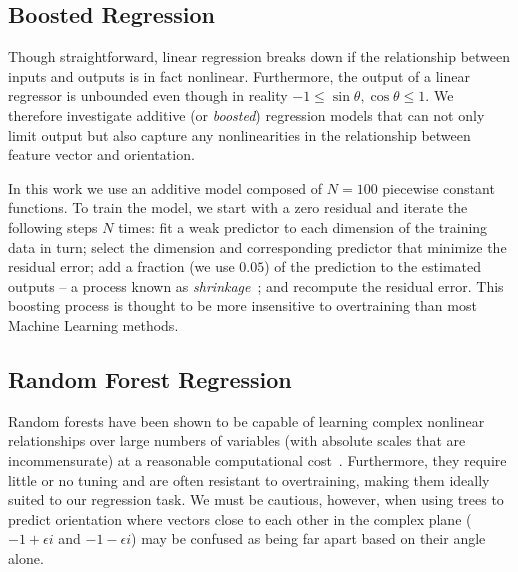 \documentclass[10pt,twocolumn,letterpaper]{article}
\begin{document}
%


\subsection{Boosted Regression}
\label{s:learning_boosted}
Though straightforward, linear regression breaks down if the relationship between inputs and outputs is in fact nonlinear. Furthermore, the output of a linear regressor is unbounded even though in reality $-1 \leq \sin\theta,\cos\theta \leq 1$. We therefore investigate additive (or \emph{boosted}) regression models that can not only limit output but also capture any nonlinearities in the relationship between feature vector and orientation.

In this work we use an additive model composed of $N=100$ piecewise constant functions. To train the model, we start with a zero residual and iterate the following steps $N$ times: fit a weak predictor to each dimension of the training data in turn; select the dimension and corresponding predictor that minimize the residual error; add a fraction (we use $0.05$) of the prediction to the estimated outputs -- a process known as \emph{shrinkage}~\cite{Friedman_AoS01}; and recompute the residual error. This boosting process is thought to be more insensitive to overtraining than most Machine Learning methods.


\subsection{Random Forest Regression}
\label{s:learning_forest}
Random forests have been shown to be capable of learning complex nonlinear relationships over large numbers of variables (with absolute scales that are incommensurate) at a reasonable computational cost~\cite{Breiman_ML01}. Furthermore, they require little or no tuning and are often resistant to overtraining, making them ideally suited to our regression task. We must be cautious, however, when using trees to predict orientation where vectors close to each other in the complex plane (\eg~$-1+\epsilon i$ and $-1-\epsilon i$) may be confused as being far apart based on their angle alone.
\end{document}
